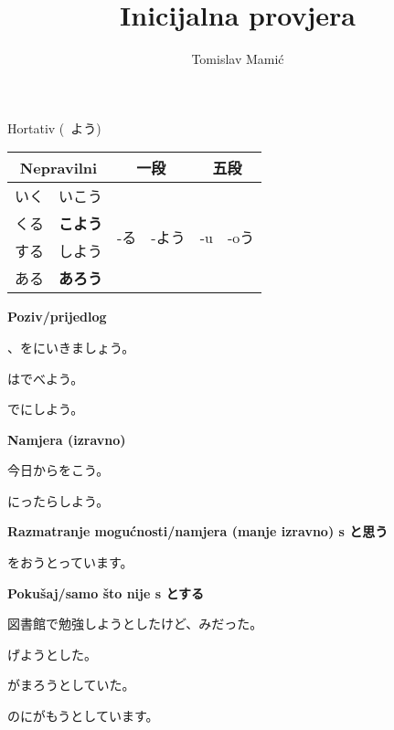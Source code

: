 \documentclass[12pt]{article}
\author{Tomislav Mamić}
\title{Inicijalna provjera}
\begin{document}
	\Large Hortativ (~よう)
	
	\large
	\vspace{20pt}
	\begin{tabular}{r l|r l|r l}
		\multicolumn{2}{c}{Nepravilni}&\multicolumn{2}{c}{一段}&\multicolumn{2}{c}{五段}\\
		\hline
		いく&いこう&\multirow{4}{20pt}{-る}&\multirow{4}{25pt}{-よう}&\multirow{4}{20pt}{-u}&\multirow{4}{30pt}{-oう}\\
		くる&\textbf{こよう}&&&\\
		する&しよう&&&\\
		ある&\textbf{あろう}&&&\\
	\end{tabular}

	\vspace{20pt}
	\large \textbf{Poziv/prijedlog}
	\vspace{10pt}
	
	、をにいきましょう。
	
	はでべよう。
	
	でにしよう。
	
	\vspace{10pt}
	\textbf{Namjera (izravno)}
	\vspace{10pt}
	
	今日からをこう。
	
	にったらしよう。
	
	\vspace{10pt}
	\textbf{Razmatranje mogućnosti/namjera (manje izravno) s と思う}
	\vspace{10pt}
	
	をおうとっています。
	
	\vspace{10pt}
	\textbf{Pokušaj/samo što nije s とする}
	\vspace{10pt}
	
	図書館で勉強しようとしたけど、みだった。
	
	げようとした。
	
	がまろうとしていた。
	
	のにがもうとしています。
\end{document}
